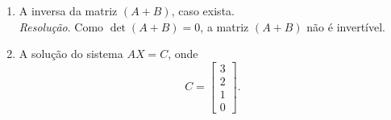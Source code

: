 \begin{enumerate}
\begin{align*}
\begin{array}{cccc}
                0 & 0 & 4 & 1 \\
                0 & -2 & 2 & -1
            \end{array}
        \right| 
    \end{align*}
    Fixando a coluna 1 temos:
    \begin{align*}
        \det (A + B) &= a_{21} \cdot C_{21} \\ 
        &= 4 \cdot (-1) \cdot \det \left|
            \begin{array}{ccc}
                -2 & 2 & -1 \\
                0 & 4 & 1 \\
                -2 & 2 & -1
            \end{array}
        \right| \\
        &= -4 \cdot 0 \\
        &= 0
    \end{align*}
    Portanto, $\det (A + B) = 0$.
    \item A inversa da matriz $(A + B)$, caso exista. \\
    \emph{Resolução}. Como $\det (A + B) = 0$, a matriz $(A + B)$ não é invertível.
    \item A solução do sistema $AX = C$, onde 
    \begin{displaymath}
        C = \left[\begin{array}{c} 3 \\ 2 \\ 1 \\ 0 \end{array}\right].    
    \end{displaymath}
\end{enumerate}